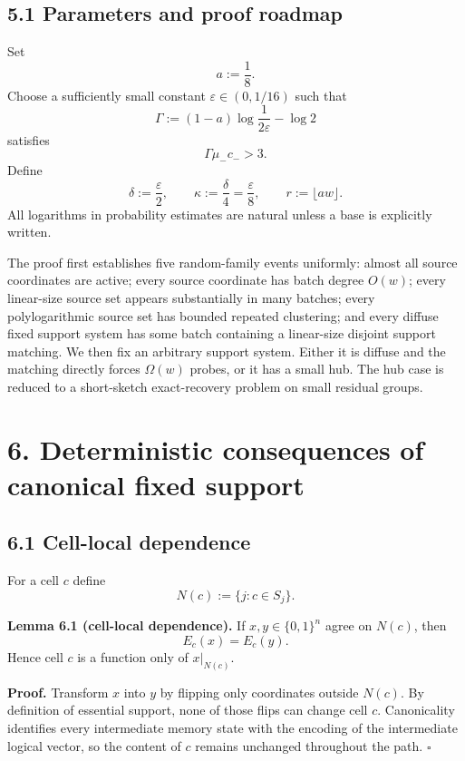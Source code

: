\documentclass[
]{article}
\begin{document}
\hypertarget{parameters-and-proof-roadmap}{%
\subsection{5.1 Parameters and proof
roadmap}\label{parameters-and-proof-roadmap}}

Set \[
a:=\frac18.
\] Choose a sufficiently small constant \(\varepsilon\in(0,1/16)\) such
that \[
\Gamma
:=(1-a)\log\frac1{2\varepsilon}-\log2
\] satisfies \[
\Gamma\mu_-c_->3.
\] Define \[
\delta:=\frac\varepsilon2,
\qquad
\kappa:=\frac\delta4=\frac\varepsilon8,
\qquad
r:=\lfloor aw\rfloor.
\] All logarithms in probability estimates are natural unless a base is
explicitly written.

The proof first establishes five random-family events uniformly: almost
all source coordinates are active; every source coordinate has batch
degree \(O(w)\); every linear-size source set appears substantially in
many batches; every polylogarithmic source set has bounded repeated
clustering; and every diffuse fixed support system has some batch
containing a linear-size disjoint support matching. We then fix an
arbitrary support system. Either it is diffuse and the matching directly
forces \(\Omega(w)\) probes, or it has a small hub. The hub case is
reduced to a short-sketch exact-recovery problem on small residual
groups.

\hypertarget{deterministic-consequences-of-canonical-fixed-support}{%
\section{6. Deterministic consequences of canonical fixed
support}\label{deterministic-consequences-of-canonical-fixed-support}}

\hypertarget{cell-local-dependence}{%
\subsection{6.1 Cell-local dependence}\label{cell-local-dependence}}

For a cell \(c\) define \[
N(c):=\{j:c\in S_j\}.
\]

\textbf{Lemma 6.1 (cell-local dependence).} If \(x,y\in\{0,1\}^n\) agree
on \(N(c)\), then \[
E_c(x)=E_c(y).
\] Hence cell \(c\) is a function only of \(x|_{N(c)}\).

\textbf{Proof.} Transform \(x\) into \(y\) by flipping only coordinates
outside \(N(c)\). By definition of essential support, none of those
flips can change cell \(c\). Canonicality identifies every intermediate
memory state with the encoding of the intermediate logical vector, so
the content of \(c\) remains unchanged throughout the path. \(\square\)
\end{document}
